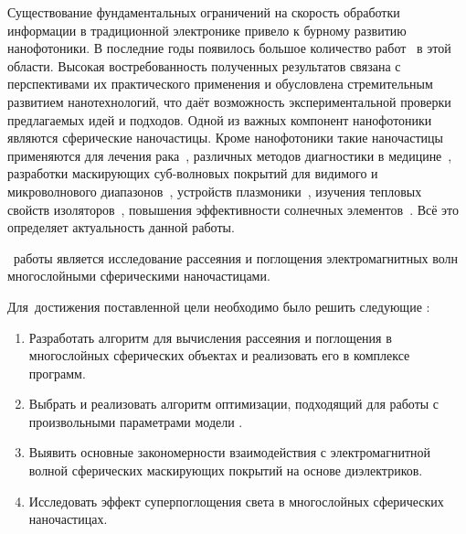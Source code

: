 {\actuality} Существование фундаментальных ограничений на скорость
обработки информации в традиционной электронике привело к бурному
развитию нанофотоники. В последние годы появилось большое количество
работ~\cite{Tame-quantum-plasmonics-2013,
  Javier-graphene-plasmonics-2014, Khurgin-loss-plasmonics-2015,
  He-tunable-terahertz-graphene-metamaterials-2015,
  Segal-meta-nonlinar-PhC-2015,
  Poddubny-hyperbolic-metamaterials-2013, Kildishev-metasurface-2013}
в этой области.  Высокая востребованность полученных результатов
связана с перспективами их практического применения и обусловлена
стремительным развитием нанотехнологий, что даёт возможность
экспериментальной проверки предлагаемых идей и подходов. Одной из
важных компонент нанофотоники являются сферические наночастицы.  Кроме
нанофотоники такие наночастицы применяются для лечения
рака~\cite{Zhang-2010, Hirsch-2003}, различных методов диагностики в
медицине~\cite{Allain-2002}, разработки маскирующих суб-волновых
покрытий для видимого и микроволнового диапазонов~\cite{Qui-2009,
  Semouchkina-2013}, устройств плазмоники~\cite{Martin-2013,
  Alu-2005}, изучения тепловых свойств изоляторов~\cite{Xie-2013},
повышения эффективности солнечных элементов~\cite{Kameya-2011,
  Mann-2011}.  Всё это определяет актуальность данной работы.

  
\aim\ работы является %
исследование рассеяния и поглощения электромагнитных волн многослойными
сферическими наночастицами.

Для~достижения поставленной цели необходимо было решить следующие {\tasks}:
\begin{enumerate}
  \item Разработать алгоритм для вычисления рассеяния и поглощения в
    многослойных сферических объектах и реализовать его в комплексе программ.
  \item Выбрать и реализовать алгоритм оптимизации, подходящий для
    работы с произвольными параметрами модели%
    .
  \item Выявить основные закономерности взаимодействия с
    электромагнитной волной сферических маскирующих покрытий на
    основе диэлектриков.
  \item Исследовать эффект суперпоглощения света в многослойных
    сферических наночастицах.
\end{enumerate}

